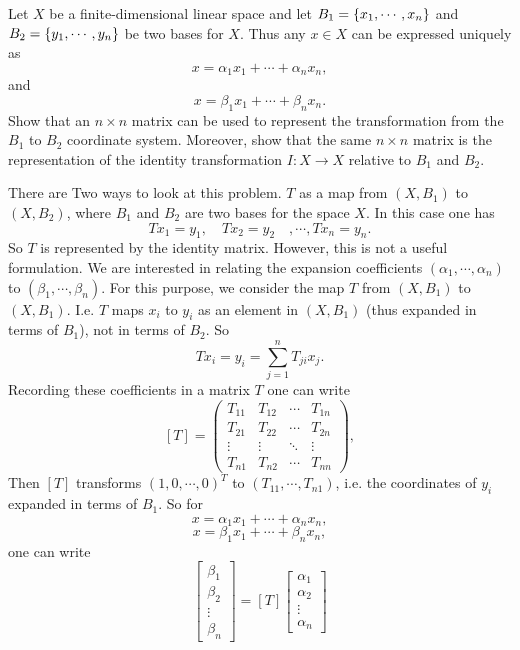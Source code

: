 \begin{problem}
	Let $ X $ be a finite-dimensional linear space and let $ B_1 = \{x_1,\cdots, x_n\} $ and $ B_2 = \{y_1,\cdots,y_n\} $ be two bases for $ X $. Thus any $ x\in X $ can be expressed uniquely as 
	\[ x = \alpha_1 x_1 + \cdots + \alpha_n x_n, \]
	and
	\[ x = \beta_1 x_1 + \cdots + \beta_n x_n. \]
	Show that an $ n\times n $ matrix can be used to represent the transformation from the $ B_1 $ to $ B_2 $ coordinate system. Moreover, show that the same $ n\times n $ matrix is the representation of the identity transformation $ I:X\to X $ relative to $ B_1 $ and $ B_2 $.
\end{problem}
\begin{solution}
	There are Two ways to look at this problem. $ T $ as a map from $ (X,B_1) $ to $ (X,B_2) $, where $ B_1 $ and $ B_2 $ are two bases for the space $ X $. In this case one has
	\[ T x_1 = y_1, \quad T x_2 = y_2 \quad,\cdots, Tx_n = y_n. \]
	So $ T $ is represented by the identity matrix. However, this is not a useful formulation. We are interested in relating the expansion coefficients $ (\alpha_1,\cdots,\alpha_n) $ to $ (\beta_1,\cdots,\beta_n) $. For this purpose, we consider the map $ T $ from $ (X,B_1) $ to $ (X,B_1) $. I.e. $ T $ maps $ x_i $ to $ y_i $ as an element in $ (X,B_1) $ (thus expanded in terms of $ B_1 $), not in terms of $ B_2 $. So 
	\[ Tx_i = y_i = \sum_{j=1}^{n} T_{ji} x_j. \]
	Recording these coefficients in a matrix $ T $ one can write
	\[ [T] = \begin{pmatrix}
		T_{11} & T_{12} & \cdots & T_{1n} \\
		T_{21} & T_{22} & \cdots & T_{2n} \\
		\vdots & \vdots & \ddots & \vdots \\
		T_{n1} & T_{n2} & \cdots & T_{nn}
	\end{pmatrix}, \]
	Then $ [T] $ transforms $ (1,0,\cdots,0)^T $ to $ (T_{11},\cdots,T_{n1}) $, i.e. the coordinates of $ y_i $ expanded in terms of $ B_1 $. So for
	\[ x = \alpha_1 x_1 + \cdots + \alpha_n x_n, \]
	\[ x = \beta_1 x_1 + \cdots + \beta_n x_n, \]
	one can write
	\[ 
	\begin{bmatrix}
		\beta_1 \\ \beta_2 \\ \vdots \\ \beta_n
	\end{bmatrix}
	 = 
	 [T]
	 \begin{bmatrix}
	 	\alpha_1 \\ \alpha_2 \\ \vdots \\ \alpha_n
	 \end{bmatrix}
	 \]
\end{solution}


